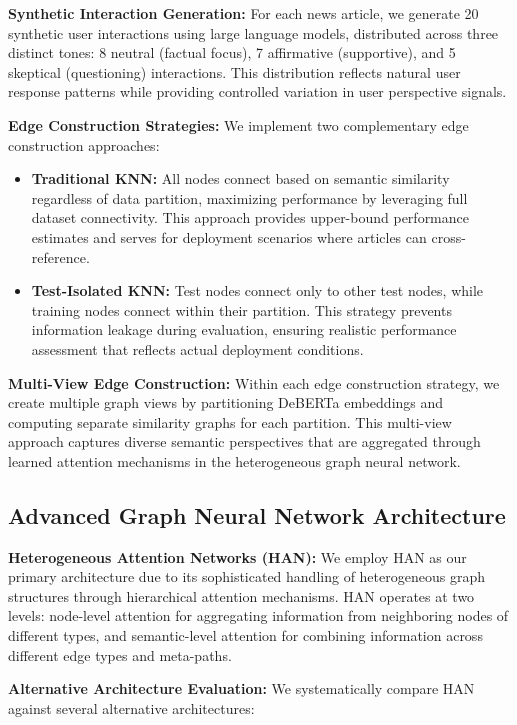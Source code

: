 \textbf{Synthetic Interaction Generation:} For each news article, we generate 20 synthetic user interactions using large language models, distributed across three distinct tones: 8 neutral (factual focus), 7 affirmative (supportive), and 5 skeptical (questioning) interactions. This distribution reflects natural user response patterns while providing controlled variation in user perspective signals.

\textbf{Edge Construction Strategies:} We implement two complementary edge construction approaches:

\begin{itemize}
\item \textbf{Traditional KNN:} All nodes connect based on semantic similarity regardless of data partition, maximizing performance by leveraging full dataset connectivity. This approach provides upper-bound performance estimates and serves for deployment scenarios where articles can cross-reference.

\item \textbf{Test-Isolated KNN:} Test nodes connect only to other test nodes, while training nodes connect within their partition. This strategy prevents information leakage during evaluation, ensuring realistic performance assessment that reflects actual deployment conditions.
\end{itemize}

\textbf{Multi-View Edge Construction:} Within each edge construction strategy, we create multiple graph views by partitioning DeBERTa embeddings and computing separate similarity graphs for each partition. This multi-view approach captures diverse semantic perspectives that are aggregated through learned attention mechanisms in the heterogeneous graph neural network.

\subsection{Advanced Graph Neural Network Architecture}

\textbf{Heterogeneous Attention Networks (HAN):} We employ HAN as our primary architecture due to its sophisticated handling of heterogeneous graph structures through hierarchical attention mechanisms. HAN operates at two levels: node-level attention for aggregating information from neighboring nodes of different types, and semantic-level attention for combining information across different edge types and meta-paths.

\textbf{Alternative Architecture Evaluation:} We systematically compare HAN against several alternative architectures:

